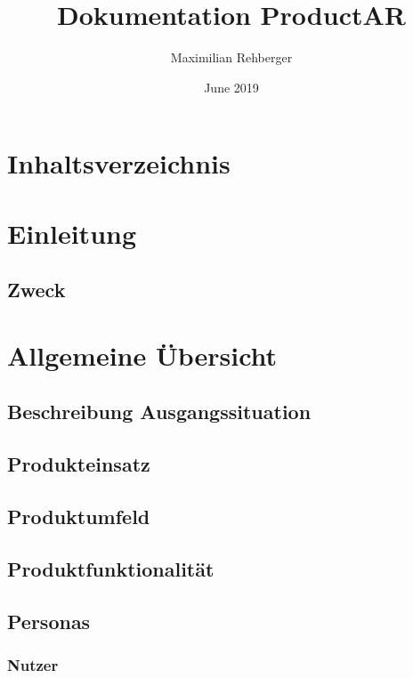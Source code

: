 \documentclass{scrartcl}
\title{Dokumentation ProductAR}
\author{Maximilian Rehberger}
\date{June 2019}
\begin{document}
\maketitle

\newpage


\renewcommand*\contentsname{}
\section{Inhaltsverzeichnis}
\tableofcontents{}


\newpage

\section{Einleitung}

\subsection{Zweck}

\newpage

\section{Allgemeine Übersicht}

\subsection{Beschreibung Ausgangssituation}

\subsection{Produkteinsatz}

\subsection{Produktumfeld}

\subsection{Produktfunktionalität}

\subsection{Personas}

\subsubsection{Nutzer}
\end{document}
